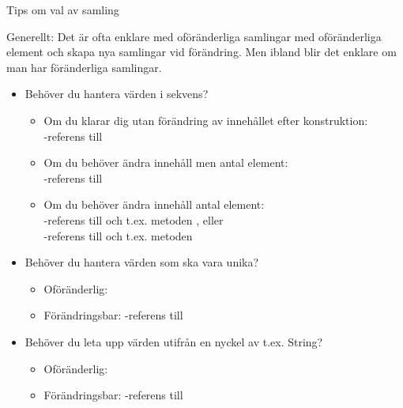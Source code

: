\begin{Slide}{Tips om val av samling}\SlideFontSmall

Generellt: Det är ofta enklare med oföränderliga samlingar med oföränderliga element och skapa nya samlingar vid förändring. Men ibland blir det enklare om man har föränderliga samlingar.

\begin{itemize}
\item Behöver du hantera värden i sekvens?
\begin{itemize}\SlideFontTiny
\item Om du klarar dig utan förändring av innehållet efter konstruktion:\\
-referens till 
\item Om du behöver ändra innehåll men  antal element:\\
-referens till 
\item Om du behöver ändra innehåll  antal element:
\\ -referens till  och t.ex. metoden , eller \\
-referens till  och t.ex. metoden 
\end{itemize}

\item Behöver du hantera värden  som ska vara unika?
\begin{itemize}\SlideFontTiny
\item Oföränderlig: 
\item Förändringsbar: -referens till 
\end{itemize}

\item Behöver du leta upp värden  utifrån en nyckel av t.ex. String?
\begin{itemize}\SlideFontTiny
\item Oföränderlig: 
\item Förändringsbar: -referens till 
\end{itemize}


\end{itemize}
\end{Slide}

